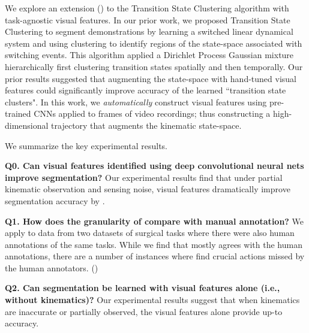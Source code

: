 We explore an extension (\tsc) to the Transition State Clustering algorithm \cite{krishnan2015tsc} with task-agnostic visual features.
In our prior work, we proposed Transition State Clustering to segment demonstrations by learning a switched linear dynamical system and using clustering to identify regions of the state-space associated with switching events.
This algorithm applied a Dirichlet Process Gaussian mixture hierarchically first clustering transition states spatially and then temporally.
Our prior results suggested that augmenting the state-space with hand-tuned visual features could significantly improve accuracy of the learned ``transition state clusters".
In this work, we \emph{automatically} construct visual features using pre-trained CNNs applied to frames of video recordings; thus constructing a high-dimensional trajectory that augments the kinematic state-space.

We summarize the key experimental results.

\vspace{0.25em}

\noindent \textbf{Q0. Can visual features identified using deep convolutional neural nets improve segmentation? } Our experimental results find that under partial kinematic observation and sensing noise, visual features dramatically improve segmentation accuracy by .

\vspace{0.25em}

\noindent \textbf{Q1. How does the granularity of \tsc compare with manual annotation? } We apply \tsc to data from two datasets of surgical tasks \cite{gao2014jigsaws} where there were also human annotations of the same tasks.
While we find that \tsc mostly agrees with the human annotations, there are a number of instances where \tsc find crucial actions missed by the human annotators. () 

\vspace{0.25em}

\noindent \textbf{Q2. Can segmentation be learned with visual features alone (i.e., without kinematics)? } Our experimental results suggest that when kinematics are inaccurate or partially observed, the visual features alone provide up-to  accuracy.

